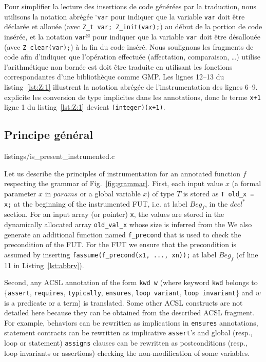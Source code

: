 Pour simplifier la lecture des insertions de code générées par la traduction,
nous utilisons la notation abrégée ${}^{\square}$\lstinline{var} pour indiquer
que la variable \lstinline{var} doit être déclarée et allouée (avec
\lstinline{Z_t var; Z_init(var);}) au début de la portion de code insérée, et la
notation \lstinline{var}${}^{\boxtimes}$ pour indiquer que la variable
\lstinline{var} doit être désallouée (avec \lstinline{Z_clear(var);})
à la fin du code inséré.
Nous soulignons les fragments de code afin d'indiquer que l'opération effectuée
(affectation, comparaison, \dots) utilise l'arithmétique non bornée est doit
être traduite en utilisant les fonctions correspondantes d'une bibliothèque
comme GMP.
Les lignes 12--13 du listing~\ref{lst:Z:1} illustrent la notation abrégée de 
l'instrumentation des lignes 6--9.
\framac explicite les conversion de type implicites dans les annotations, donc
le terme \lstinline'x+1' ligne 1 du listing~\ref{lst:Z:1} devient
\lstinline'(integer)(x+1)'.


\subsection{Principe général}
\label{sec:principles}



                {listings/is_present_instrumented.c}


Let us describe the principles of instrumentation for an annotated function
$f$ respecting the grammar of Fig.~\ref{fig:grammar}.
First, each input value $x$ (a formal parameter $x$ in $params$ or a global variable $x$) of type
$T$ is stored as \lstinline|T old_x = x;|
at the beginning of the instrumented FUT, i.e. at label $Beg_f$, in
the $decl^*$ section.
For an input array  (or pointer) \lstinline'x', the values are stored in the dynamically
allocated array \lstinline'old_val_x' whose size is inferred from the
We also generate an additional function named \lstinline'f_precond'
that is used to check the precondition of the FUT. For the  FUT  we ensure
that the precondition is assumed by inserting 
\lstinline|fassume(f_precond(x1, ..., xn));| 
at label $Beg_{f}$
(cf line 11 in Listing~\ref{lst:abbrv}).

Second, any \textsc{ACSL} annotation of the form \lstinline|kwd w| (where
keyword \lstinline|kwd| belongs to \{\lstinline|assert|, \lstinline|requires|,
\lstinline|typically|, \lstinline|ensures|, \lstinline|loop variant|,
\lstinline|loop invariant|\} and $w$ is a predicate or a term) is translated.
Some other \textsc{ACSL} constructs are not detailed here because they can be
obtained from the described \textsc{ACSL} fragment. For example, behaviors can
be rewritten as implications in \lstinline|ensures| annotations,
statement contracts can be rewritten as implicative \lstinline|assert|'s and
global (resp., loop or statement)
\lstinline|assigns| clauses can be rewritten as postconditions
(resp., loop invariants or assertions)
checking the non-modification of some variables. 

